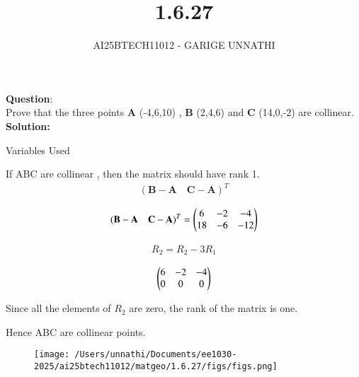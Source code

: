 \documentclass[journal]{IEEEtran}
\begin{document}

\vspace{3cm}

\title{1.6.27}
\author{AI25BTECH11012 - GARIGE UNNATHI}
{\let\newpage\relax\maketitle}


\renewcommand{\thefigure}{\theenumi}
\renewcommand{\thetable}{\theenumi}
\setlength{\intextsep}{10pt} %


\renewcommand{\thetable}{\theenumi}


\textbf{Question}:\\
Prove that the three points \textbf{A} (-4,6,10) , \textbf{B} (2,4,6) and \textbf{C} (14,0,-2) are collinear.
\\
\textbf{Solution: }

 \begin{table}[h!]    
      \centering
      
      \caption{Variables Used}
      \label{}
    \end{table}

 If ABC are collinear , then the matrix should have rank 1.
 \begin{align*}
{(\textbf{B} - \textbf{A} \quad \textbf{C} - \textbf{A})}^T
\end{align*}


\begin{align}
    {(\textbf{B} - \textbf{A} \quad \textbf{C} - \textbf{A})}^T =  \begin{pmatrix}
6 & -2 & -4 \\
18 & -6 & -12 
\end{pmatrix}
\end{align}


\begin{align}
    R_2 = R_2 - 3R_1
\end{align}


\begin{align}
     \begin{pmatrix}
6 & -2 & -4 \\
0 & 0 & 0 
\end{pmatrix}
\end{align}

Since all the elements of $R_2$ are zero, the rank of the matrix is one.

Hence ABC are collinear points.

\begin{figure}[h!]
   \centering
   \texttt{[image: /Users/unnathi/Documents/ee1030-2025/ai25btech11012/matgeo/1.6.27/figs/figs.png]}
   \caption{}
   \label{stemplot}
\end{figure}
\end{document}
